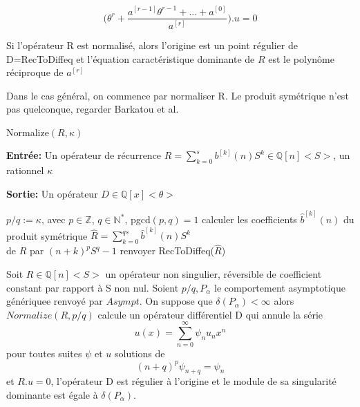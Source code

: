 \documentclass[a4paper,10.5pt]{article}
\begin{document}
	\[\big(\theta^{r}+\frac{a^{[r-1]}\theta^{r-1}+...+a^{[0]}}{a^{[r]}}\big).u=0\]
	
	\begin{proposition}Si l'opérateur R est normalisé, alors l'origine est un point régulier de D=RecToDiffeq et l'équation caractéristique dominante de $R$ est le polynôme réciproque de $a^{[r]}$ 
	\end{proposition}
	
	Dans le cas général, on commence par normaliser R.
	Le produit symétrique n'est pas quelconque, regarder Barkatou et al.
	\begin{algorithm}
		\caption{Normalize$(R,\kappa)$}
		
		\vspace{2mm}
		
		\textbf{Entrée:} Un opérateur de récurrence $R=\sum_{k=0}^{s} b^{[k]}(n)S^{k} \in \mathbb{Q}[n]\big<S\big>$, un rationnel $\kappa$
		
		\textbf{Sortie:} Un opérateur $D \in \mathbb{Q}[x] \big<\theta\big>$ 
		
		\begin{algorithmic}[1]
			\vspace{4mm}
			\STATE $p/q:=\kappa$, avec $p \in \mathbb{Z}$, $q \in \mathbb{N}^{*}$, pgcd$(p,q)=1$
			\vspace{4mm}
			\STATE calculer les coefficients $\hat{b}^{[k]}(n)$ du produit symétrique $\hat{R}=\sum_{k=0}^{qs}\hat{b}^{[k]}(n)S^{k}$\\
			\vspace{2mm}
			de $R$ par $(n+k)^{p}S^{q}-1$
			\vspace{4mm}
			\STATE renvoyer RecToDiffeq($\hat{R}$)
		\end{algorithmic}
		
	\end{algorithm}
	
	
	\begin{proposition}Soit $R \in \mathbb{Q}[n]\big< S\big>$ un opérateur non singulier, réversible de coefficient constant par rapport à S non nul. Soient $p/q, P_{\alpha}$ le comportement asymptotique génériquee renvoyé par $Asympt$. On suppose que $\delta(P_{\alpha})<\infty$ alors $Normalize(R,p/q)$ calcule un opérateur différentiel D qui annule la série 
		\[u(x)=\sum_{n=0}^{\infty} \psi_{n}u_{n}x^{n}\]
		pour toutes suites $\psi$ et $u$ solutions de
		\[(n+q)^{p}\psi_{n+q}=\psi_{n}\]
		et $R.u=0$, l'opérateur D est régulier à l'origine et le module de sa singularité dominante est égale à $\delta(P_{\alpha})$.
	\end{proposition}
	
\end{document}
